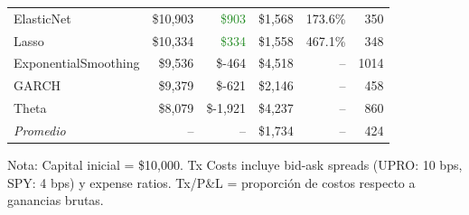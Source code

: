 \begin{table}[htbp]
\begin{tabular}{@{}lrrrrr@{}}
ElasticNet & \$10,903 & \textcolor{ForestGreen}{\$903} & \$1,568 & 173.6\% & 350 \\
Lasso & \$10,334 & \textcolor{ForestGreen}{\$334} & \$1,558 & 467.1\% & 348 \\
ExponentialSmoothing & \$9,536 & \textcolor{BrickRed}{\$-464} & \$4,518 & -- & 1014 \\
GARCH & \$9,379 & \textcolor{BrickRed}{\$-621} & \$2,146 & -- & 458 \\
Theta & \$8,079 & \textcolor{BrickRed}{\$-1,921} & \$4,237 & -- & 860 \\
\midrule
\textit{Promedio} & -- & -- & \$1,734 & -- & 424 \\
\bottomrule
\end{tabular}
\begin{tablenotes}
\small
\item Nota: Capital inicial = \$10,000. Tx Costs incluye bid-ask spreads (UPRO: 10 bps, SPY: 4 bps) y expense ratios. Tx/P\&L = proporci\'on de costos respecto a ganancias brutas.
\end{tablenotes}
\end{table}
